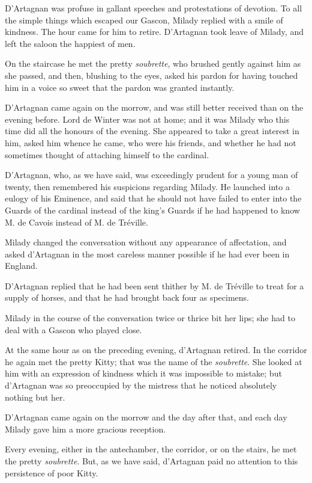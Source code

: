 D'Artagnan was profuse in gallant speeches and protestations of devotion. To all the simple things which escaped our Gascon, Milady replied with a smile of kindness. The hour came for him to retire. D'Artagnan took leave of Milady, and left the saloon the happiest of men. 

On the staircase he met the pretty \textit{soubrette}, who brushed gently against him as she passed, and then, blushing to the eyes, asked his pardon for having touched him in a voice so sweet that the pardon was granted instantly. 

D'Artagnan came again on the morrow, and was still better received than on the evening before. Lord de Winter was not at home; and it was Milady who this time did all the honours of the evening. She appeared to take a great interest in him, asked him whence he came, who were his friends, and whether he had not sometimes thought of attaching himself to the cardinal. 

D'Artagnan, who, as we have said, was exceedingly prudent for a young man of twenty, then remembered his suspicions regarding Milady. He launched into a eulogy of his Eminence, and said that he should not have failed to enter into the Guards of the cardinal instead of the king's Guards if he had happened to know M. de Cavois instead of M. de Tréville. 

Milady changed the conversation without any appearance of affectation, and asked d'Artagnan in the most careless manner possible if he had ever been in England. 

D'Artagnan replied that he had been sent thither by M. de Tréville to treat for a supply of horses, and that he had brought back four as specimens. 

Milady in the course of the conversation twice or thrice bit her lips; she had to deal with a Gascon who played close. 

At the same hour as on the preceding evening, d'Artagnan retired. In the corridor he again met the pretty Kitty; that was the name of the \textit{soubrette}. She looked at him with an expression of kindness which it was impossible to mistake; but d'Artagnan was so preoccupied by the mistress that he noticed absolutely nothing but her. 

D'Artagnan came again on the morrow and the day after that, and each day Milady gave him a more gracious reception. 

Every evening, either in the antechamber, the corridor, or on the stairs, he met the pretty \textit{soubrette}. But, as we have said, d'Artagnan paid no attention to this persistence of poor Kitty.